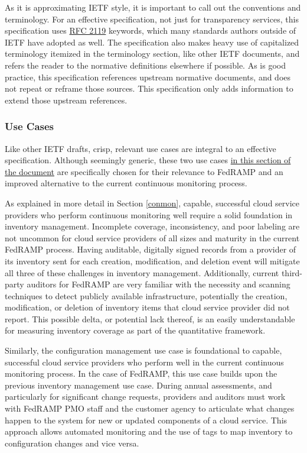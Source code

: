 \documentclass{jdf}
\begin{document}
As it is approximating IETF style, it is important to call out the conventions and terminology. For an effective specification, not just for transparency services, this specification uses \href{https://datatracker.ietf.org/doc/html/rfc2119}{RFC 2119} keywords, which many standards authors outside of IETF have adopted as well. The specification also makes heavy use of capitalized terminology itemized in the terminology section, like other IETF documents, and refers the reader to the normative definitions elsewhere if possible. As is good practice, this specification references upstream normative documents, and does not repeat or reframe those sources. This specification only adds information to extend those upstream references.

\subsubsection{Use Cases}

Like other IETF drafts, crisp, relevant use cases are integral to an effective specification. Although seemingly generic, these two use cases \href{https://aj-stein.github.io/conmotion/architecture.html#use-cases}{in this section of the document} are specifically chosen for their relevance to FedRAMP and an improved alternative to the current continuous monitoring process.

As explained in more detail in Section \ref{conmon}, capable, successful cloud service providers who perform continuous monitoring well require a solid foundation in inventory management. Incomplete coverage, inconsistency, and poor labeling are not uncommon for cloud service providers of all sizes and maturity in the current FedRAMP process. Having auditable, digitally signed records from a provider of its inventory sent for each creation, modification, and deletion event will mitigate all three of these challenges in inventory management. Additionally, current third-party auditors for FedRAMP are very familiar with the necessity and scanning techniques to detect publicly available infrastructure, potentially the creation, modification, or deletion of inventory items that cloud service provider did not report. This possible delta, or potential lack thereof, is an easily understandable for measuring inventory coverage as part of the quantitative framework.

Similarly, the configuration management use case is foundational to capable, successful cloud service providers who perform well in the current continuous monitoring process. In the case of FedRAMP, this use case builds upon the previous inventory management use case. During annual assessments, and particularly for significant change requests, providers and auditors must work with FedRAMP PMO staff and the customer agency to articulate what changes happen to the system for new or updated components of a cloud service. This approach allows automated monitoring and the use of tags to map inventory to configuration changes and vice versa.
\end{document}
